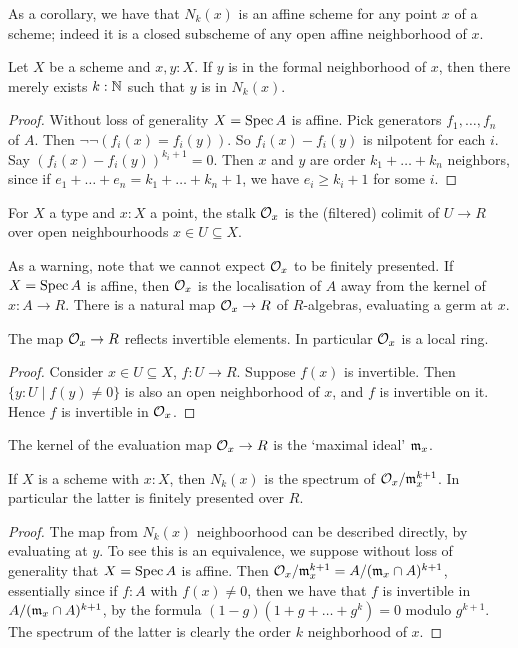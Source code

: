 As a corollary, we have that $N_k(x)$ is an affine scheme
for any point $x$ of a scheme; 
indeed it is a closed subscheme of any open affine neighborhood of $x$.

\begin{lemma}\label{formal-nbhd-union}
Let $X$ be a scheme and $x, y : X$. If $y$ is in the formal neighborhood of $x$,
then there merely exists $k : \mathbb{N}$ such that $y$ is in $N_k(x)$.
\end{lemma}
\begin{proof}
Without loss of generality $X = \operatorname{Spec} A$ is affine. Pick generators
$f_1,\ldots,f_n$ of $A$. Then $\neg \neg(f_i(x)=f_i(y))$.
So $f_i(x)-f_i(y)$ is nilpotent for each $i$.
Say $(f_i(x)-f_i(y))^{k_i+1} = 0$.
Then $x$ and $y$ are order $k_1+\ldots+k_n$ neighbors, since
if $e_1+\ldots+e_n = k_1+\ldots+k_n+1$, we have
$e_i \ge k_i+1$ for some $i$.
\end{proof}

\begin{definition}
For $X$ a type and $x : X$ a point, the stalk $\mathcal{O}_x$ is the (filtered) 
colimit of $U \to R$ over open neighbourhoods $x \in U \subseteq X$.
\end{definition}

As a warning, note that we cannot expect $\mathcal{O}_x$ to be finitely presented.
If $X = \operatorname{Spec} A$ is affine, then $\mathcal{O}_x$ is the localisation of $A$ away from the kernel
of $x : A \to R$.
There is a natural map $\mathcal{O}_x \to R$ of $R$-algebras, evaluating a germ at $x$.

\begin{lemma}
The map $\mathcal{O}_x \to R$ reflects invertible elements. In particular $\mathcal{O}_x$ is a local ring.
\end{lemma}
\begin{proof}
Consider $x \in U \subseteq X$, $f : U \to R$. Suppose $f(x)$ is invertible.
Then $\{y : U \mid f(y) \ne 0 \}$ is also an open neighborhood of $x$,
and $f$ is invertible on it. Hence $f$ is invertible in $\mathcal{O}_x$.
\end{proof}
\begin{definition}
The kernel of the evaluation map $\mathcal{O}_x \to R$ is the `maximal ideal' $\mathfrak{m}_x$.
\end{definition}

\begin{lemma}\label{nbhd-is-spec}
If $X$ is a scheme with $x : X$, then $N_k(x)$ is the
spectrum of $\mathcal{O}_x / \mathfrak{m}_x^{k+1}$. In particular the latter is finitely presented
over $R$.
\end{lemma}
\begin{proof}
The map from $N_k(x)$ neighboorhood can be described directly, by evaluating
at $y$. To see this is an equivalence, we suppose without loss of generality that
$X = \operatorname{Spec} A$ is affine. Then $\mathcal{O}_x / \mathfrak{m}_x^{k+1} = A / (\mathfrak{m}_x \cap A)^{k+1}$,
essentially since if $f : A$ with $f(x) \ne 0$, then we have that
$f$ is invertible in $A / (\mathfrak{m}_x \cap A)^{k+1}$, by the formula
$(1 - g)(1 + g + \ldots + g^k) = 0$ modulo $g^{k+1}$.
The spectrum of the latter is clearly the order $k$ neighborhood of $x$.
\end{proof}

